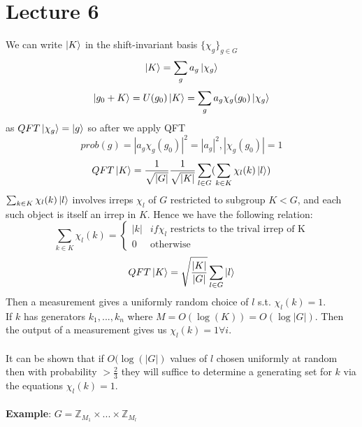 \documentclass{article}
\begin{document}
\section{Lecture 6}
We can write $\ket{K}$ in the shift-invariant basis $\{ \chi_g \}_{g \in G}$
$$
\ket{K} = \sum_g a_g \ket{\chi_g}
$$
$$
\ket{g_0+K} = U(g_0) \ket{K} = \sum_g a_g \chi_g(g_0) \ket{\chi_g}
$$
as $QFT \ket{\chi_g} = \ket{g}$ so after we apply QFT
$$
prob(g) = |a_g \chi_g(g_0)|^2 = |a_g|^2, |\chi_g(g_0) | = 1
$$
$$
QFT \ket{K} = \frac{1}{\sqrt{|G|}} \frac{1}{\sqrt{|K|}} \sum_{l \in G} ( \sum_{k \in K} \chi_l (k) \ket{l})$$
$\sum_{k \in K} \chi_l (k) \ket{l}$ involves irreps $\chi_l$ of $G$ restricted to subgroup $K < G$, and each such object is itself an irrep in $K$. Hence we have the following relation:
$$
\sum_{k \in K} \chi_l(k) = \begin{cases} |k| & if \chi_l \text{ restricts to the trival irrep of K}\\ 0 & \text{otherwise} \end{cases}
$$
$$
QFT \ket{K} = \sqrt{\frac{|K|}{|G|}} \sum_{l \in G} \ket{l}
$$
Then a measurement gives a uniformly random choice of $l$ s.t. $\chi_l(k) = 1$.\\
If $k$ has generators $k_1, ..., k_n$ where $M = O(\log(K)) = O(\log |G|)$. Then the output of a measurement gives us $\chi_l(k) = 1 \forall i$.\\\\
It can be shown that if $O(\log(|G|)$ values of $l$ chosen uniformly at random then with probability $>\frac{2}{3}$ they will suffice to determine a generating set for $k$ via the equations $\chi_l(k) = 1$.\\\\
\textbf{Example}: $G = \mathbb{Z}_{M_1} \times ... \times \mathbb{Z}_{M_l}$\\
\end{document}
